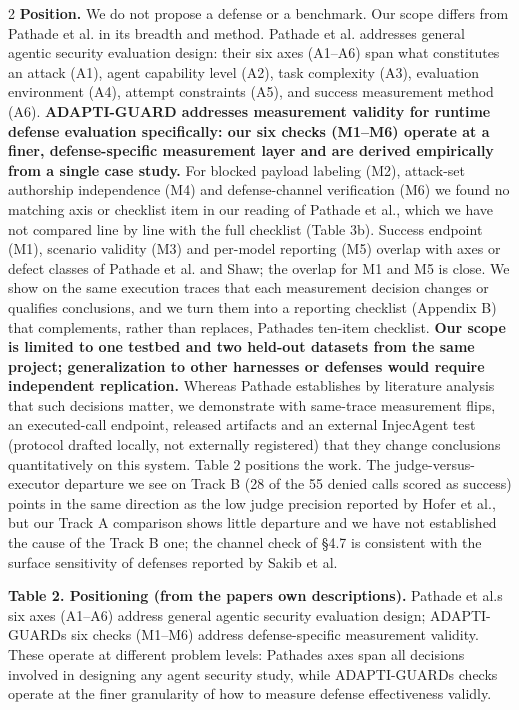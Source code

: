 \documentclass[9pt]{extarticle}
\begin{document}
\begin{multicols}{2}
\textbf{Position.} We do not propose a defense or a benchmark. Our scope differs from Pathade et al. in its breadth and method. Pathade et al. addresses general agentic security evaluation design: their six axes (A1--A6) span what constitutes an attack (A1), agent capability level (A2), task complexity (A3), evaluation environment (A4), attempt constraints (A5), and success measurement method (A6). \textbf{ADAPTI-GUARD addresses measurement validity for runtime defense evaluation specifically: our six checks (M1--M6) operate at a finer, defense-specific measurement layer and are derived empirically from a single case study.} For blocked payload labeling (M2), attack-set authorship independence (M4) and defense-channel verification (M6) we found no matching axis or checklist item in our reading of Pathade et al., which we have not compared line by line with the full checklist (Table 3b). Success endpoint (M1), scenario validity (M3) and per-model reporting (M5) overlap with axes or defect classes of Pathade et al. and Shaw; the overlap for M1 and M5 is close. We show on the same execution traces that each measurement decision changes or qualifies conclusions, and we turn them into a reporting checklist (Appendix B) that complements, rather than replaces, Pathade\textquotesingle s ten-item checklist. \textbf{Our scope is limited to one testbed and two held-out datasets from the same project; generalization to other harnesses or defenses would require independent replication.} Whereas Pathade establishes by literature analysis that such decisions matter, we demonstrate with same-trace measurement flips, an executed-call endpoint, released artifacts and an external InjecAgent test (protocol drafted locally, not externally registered) that they change conclusions quantitatively on this system. Table 2 positions the work. The judge-versus-executor departure we see on Track B (28 of the 55 denied calls scored as success) points in the same direction as the low judge precision reported by Hofer et al., but our Track A comparison shows little departure and we have not established the cause of the Track B one; the channel check of §4.7 is consistent with the surface sensitivity of defenses reported by Sakib et al.

\textbf{Table 2. Positioning (from the papers\textquotesingle{} own descriptions).} Pathade et al.\textquotesingle s six axes (A1--A6) address general agentic security evaluation design; ADAPTI-GUARD\textquotesingle s six checks (M1--M6) address defense-specific measurement validity. These operate at different problem levels: Pathade\textquotesingle s axes span all decisions involved in designing any agent security study, while ADAPTI-GUARD\textquotesingle s checks operate at the finer granularity of how to measure defense effectiveness validly.


\end{multicols}
\end{document}
